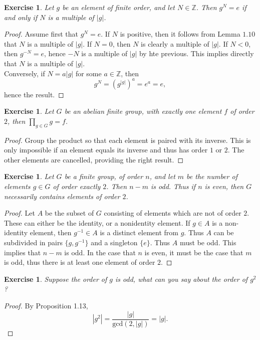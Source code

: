 \documentclass[a4paper, 11pt]{book}
\theoremstyle{plain}
\newtheorem{exercise}[theorem]{Exercise}
\theoremstyle{plain}
\begin{document}
\begin{exercise}
Let $g$ be an element of finite order, and let $N\in \mathbb{Z}$. Then $g^N=e$ if and only if $N$ is a multiple of $|g|$.
\end{exercise}
\begin{proof}
Assume first that $g^N=e$. If $N$ is positive, then it follows from Lemma $1.10$ that $N$ is a multiple of $|g|$. If $N=0$, then $N$ is clearly a multiple of $|g|$. If $N<0$, then $g^{-N}=e$, hence $-N$ is a multiple of $|g|$ by hte previous. This implies directly that $N$ is a multiple of $|g|$.\\
Conversely, if $N=a|g|$ for some $a\in \mathbb{Z}$, then
$$g^N = (g^{|g|})^a = e^a = e,$$
hence the result.
\end{proof}

\begin{exercise}
Let $G$ be an abelian finite group, with exactly one element $f$ of order $2$, then $\prod_{g\in G}g=f$.
\end{exercise}
\begin{proof}
Group the product so that each element is paired with its inverse. This is only impossible if an element equals its inverse and thus has order $1$ or $2$. The other elements are cancelled, providing the right result.
\end{proof}

\begin{exercise}
Let $G$ be a finite group, of order $n$, and let $m$ be the number of elements $g\in G$ of order exactly $2$. Then $n-m$ is odd. Thus if $n$ is even, then $G$ necessarily contains elements of order $2$.
\end{exercise}
\begin{proof}
Let $A$ be the subset of $G$ consisting of elements which are not of order $2$. These can either be the identity, or a nonidentity element. If $g\in A$ is a non-identity element, then $g^{-1}\in A$ is a distinct element from $g$. Thus $A$ can be subdivided in pairs $\{g,g^{-1}\}$ and a singleton $\{e\}$. Thus $A$ must be odd. This implies that $n-m$ is odd. In the case that $n$ is even, it must be the case that $m$ is odd, thus there is at least one element of order $2$.
\end{proof}

\begin{exercise}
Suppose the order of $g$ is odd, what can you say about the order of $g^2$?
\end{exercise}
\begin{proof}
By Proposition 1.13, 
$$|g^2| = \frac{|g|}{\text{gcd}(2, |g|)} = |g|.$$
\end{proof}
\end{document}
